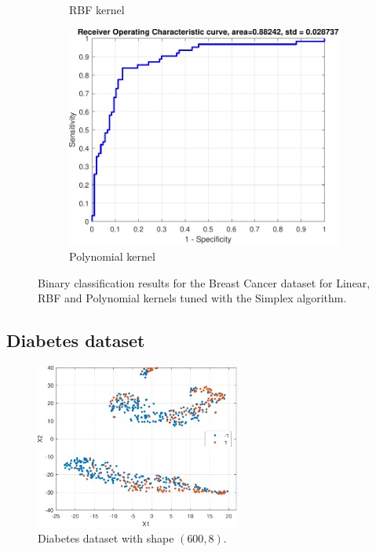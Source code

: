 \documentclass{article}
\begin{document}
\begin{figure}[h]
\begin{subfigure}[b]{0.3\textwidth}
                \caption{RBF kernel}
                 \label{fig:breast_rbf_roc}
             \end{subfigure}
             \hfill
             \begin{subfigure}[b]{0.3\textwidth}
                 \centering
                 \includegraphics[width=\textwidth]{Assignment 1/figures/breast_polynomial_classifier_roc.pdf}
                \caption{Polynomial kernel}
                 \label{fig:breast_poly_roc}
             \end{subfigure}
            \caption{Binary classification results for the Breast Cancer dataset for Linear, RBF and Polynomial kernels tuned with the Simplex algorithm.}
        \end{figure}
        
    \subsection{Diabetes dataset}
        \begin{figure}
            \centering
            \includegraphics[width=0.60\textwidth]{Assignment 1/figures/diabetes_data.pdf}
            \caption{Diabetes dataset with shape $(600,8)$.}
            \label{fig:diabetes_dataset}
        \end{figure}
        
\end{document}
